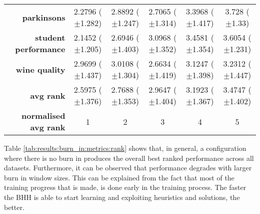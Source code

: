 \begin{table}[htb]
{\begin{tabular}{r|ccccc}
                  \textbf{parkinsons}          & \cellcolor[rgb]{ .388,  .745,  .482}2.2796 ($\pm$1.282) & \cellcolor[rgb]{ 1,  .922,  .518}2.8892 ($\pm$1.247)    & \cellcolor[rgb]{ .816,  .867,  .506}2.7065 ($\pm$1.314) & \cellcolor[rgb]{ .984,  .616,  .459}3.3968 ($\pm$1.417) & \cellcolor[rgb]{ .973,  .412,  .42}3.728 ($\pm$1.33)    \\
                  \textbf{student performance} & \cellcolor[rgb]{ .388,  .745,  .482}2.1452 ($\pm$1.205) & \cellcolor[rgb]{ .741,  .843,  .502}2.6946 ($\pm$1.403) & \cellcolor[rgb]{ 1,  .922,  .518}3.0968 ($\pm$1.352)    & \cellcolor[rgb]{ .984,  .561,  .451}3.4581 ($\pm$1.354) & \cellcolor[rgb]{ .973,  .412,  .42}3.6054 ($\pm$1.231)  \\
                  \textbf{wine quality}        & \cellcolor[rgb]{ .925,  .898,  .51}2.9699 ($\pm$1.437)  & \cellcolor[rgb]{ 1,  .922,  .518}3.0108 ($\pm$1.304)    & \cellcolor[rgb]{ .388,  .745,  .482}2.6634 ($\pm$1.419) & \cellcolor[rgb]{ .988,  .659,  .471}3.1247 ($\pm$1.398) & \cellcolor[rgb]{ .973,  .412,  .42}3.2312 ($\pm$1.447)  \\
                  \midrule
                  \textbf{avg rank}            & \cellcolor[rgb]{ .388,  .745,  .482}2.5975 ($\pm$1.376) & \cellcolor[rgb]{ .671,  .824,  .498}2.7688 ($\pm$1.353) & \cellcolor[rgb]{ 1,  .922,  .518}2.9647 ($\pm$1.404)    & \cellcolor[rgb]{ .988,  .694,  .475}3.1923 ($\pm$1.367) & \cellcolor[rgb]{ .973,  .412,  .42}3.4747 ($\pm$1.402)  \\
                  \midrule
                  \textbf{normalised avg rank} & \cellcolor[rgb]{ .388,  .745,  .482}1                   & \cellcolor[rgb]{ .694,  .831,  .498}2                   & \cellcolor[rgb]{ 1,  .922,  .518}3                      & \cellcolor[rgb]{ .988,  .667,  .471}4                   & \cellcolor[rgb]{ .973,  .412,  .42}5                    \\
            \end{tabular}%
      }
\end{table}%

Table \ref{tab:results:burn_in:metrics:rank} shows that, in general, a configuration where there is no burn in produces the overall best ranked performance across all datasets. Furthermore, it can be observed that performance degrades with larger burn in window sizes. This can be explained from the fact that most of the training progress that is made, is done early in the training process. The faster the \acs{BHH} is able to start learning and exploiting heuristics and solutions, the better.

